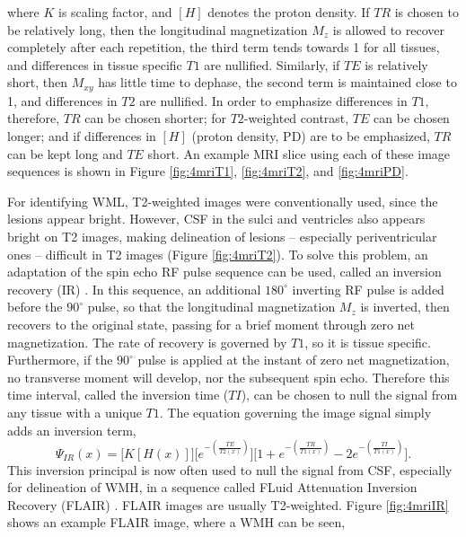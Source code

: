 where $K$ is scaling factor, and $\left[H\right]$ denotes the proton density.
If $TR$ is chosen to be relatively long, 
then the longitudinal magnetization $M_z$ is allowed to recover completely after each repetition,
the third term tends towards 1 for all tissues,
and differences in tissue specific $T1$ are nullified.
Similarly, if $TE$ is relatively short,
then $M_{xy}$ has little time to dephase,
the second term is maintained close to 1,
and differences in $T2$ are nullified.
In order to emphasize differences in $T1$, therefore, $TR$ can be chosen shorter;
for $T2$-weighted contrast, $TE$ can be chosen longer;
and if differences in $[H]$ (proton density, PD) are to be emphasized,
$TR$ can be kept long and $TE$ short.
An example MRI slice using each of these image sequences
is shown in Figure \ref{fig:4mriT1}, \ref{fig:4mriT2}, and \ref{fig:4mriPD}.
\par
For identifying WML, T2-weighted images were conventionally used, since the lesions appear bright.
However, CSF in the sulci and ventricles also appears bright on T2 images,
making delineation of lesions -- especially periventricular ones --
difficult in T2 images (Figure \ref{fig:4mriT2}).
To solve this problem, an adaptation of the spin echo RF pulse sequence can be used,
called an inversion recovery (IR) \cite{Bydder1985}.
In this sequence, an additional $180^{\circ}$ inverting RF pulse is added before the
$90^{\circ}$ pulse, so that the longitudinal magnetization $M_z$ is inverted,
then recovers to the original state, passing for a brief moment through zero net magnetization.
The rate of recovery is governed by $T1$, so it is tissue specific.
Furthermore, if the $90^{\circ}$ pulse is applied at the instant of zero net magnetization,
no transverse moment will develop, nor the subsequent spin echo.
Therefore this time interval, called the inversion time ($TI$), 
can be chosen to null the signal from any tissue with a unique $T1$.
The equation governing the image signal simply adds an inversion term,
\begin{equation}\label{eq:MRI-IR}
  \Psi_{IR}(x) = \bigg[K \left[H(x)\right]\bigg]
    \bigg[e^{-\left(\frac{TE}{T2(x)}\right)}\bigg]
    \bigg[1 + e^{-\left(\frac{TR}{T1(x)}\right)} - 2e^{-\left(\frac{TI}{T1(x)}\right)}\bigg].
\end{equation}
This inversion principal is now often used to null the signal from CSF,
especially for delineation of WMH, in a sequence called
FLuid Attenuation Inversion Recovery (FLAIR) \cite{Hajnal1992}.
FLAIR images are usually T2-weighted.
Figure \ref{fig:4mriIR} shows an example FLAIR image, where a WMH can be seen,

